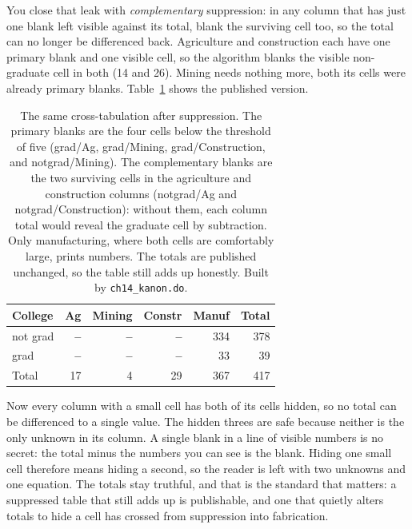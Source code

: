 You close that leak with \emph{complementary} suppression: in any column that has just one blank left visible against its total, blank the surviving cell too, so the total can no longer be differenced back. Agriculture and construction each have one primary blank and one visible cell, so the algorithm blanks the visible non-graduate cell in both (14 and 26). Mining needs nothing more, both its cells were already primary blanks. Table~\ref{tab:suppress} shows the published version.

\begin{table}[htbp]
\centering
{\footnotesize
\begin{tabular}{lrrrrr}
\hline
College   & Ag & Mining & Constr & Manuf & Total \\
\hline
not grad  & \textbf{--} & \textbf{--} & \textbf{--} & 334 & 378 \\
grad      & \textbf{--} & \textbf{--} & \textbf{--} &  33 &  39 \\
\hline
Total     & 17 &  4 & 29 & 367 & 417 \\
\hline
\end{tabular}
}
\caption[Primary and complementary suppression]{The same cross-tabulation after suppression. The primary blanks are the four cells below the threshold of five (grad/Ag, grad/Mining, grad/Construction, and notgrad/Mining). The complementary blanks are the two surviving cells in the agriculture and construction columns (notgrad/Ag and notgrad/Construction): without them, each column total would reveal the graduate cell by subtraction. Only manufacturing, where both cells are comfortably large, prints numbers. The totals are published unchanged, so the table still adds up honestly. Built by \texttt{ch14\_kanon.do}.}
\label{tab:suppress}
\end{table}

Now every column with a small cell has both of its cells hidden, so no total can be differenced to a single value. The hidden threes are safe because neither is the only unknown in its column. A single blank in a line of visible numbers is no secret: the total minus the numbers you can see is the blank. Hiding one small cell therefore means hiding a second, so the reader is left with two unknowns and one equation. The totals stay truthful, and that is the standard that matters: a suppressed table that still adds up is publishable, and one that quietly alters totals to hide a cell has crossed from suppression into fabrication.

